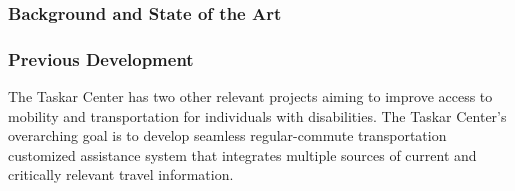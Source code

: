 

\subsubsection{Background and State of the Art}

\subsubsection{Previous Development}

The Taskar Center has two other relevant projects aiming to improve access to mobility and transportation for individuals with disabilities. The Taskar Center's overarching goal is 
to develop seamless regular-commute transportation customized assistance system that integrates multiple sources of current and critically relevant travel information.

